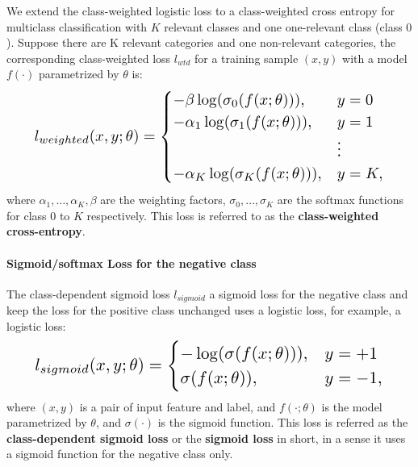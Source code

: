 We extend the class-weighted logistic loss to a class-weighted cross entropy for multiclass classification with $K$ relevant classes and one one-relevant class (class $0$).
Suppose there are K relevant categories and one non-relevant categories, the corresponding class-weighted loss $l_{wtd}$ for a training sample $(x,y)$ with a model $f(\cdot)$ parametrized by $\theta$ is:
\begin{eqnarray}
\resizebox{0.9\columnwidth}{!}{$
l_{weighted}(x, y; \theta) =
  \begin{cases}
    - \beta  \log (\sigma_0(f(x;\theta))), & y = 0 \\
    - \alpha_1 \log (\sigma_1(f(x;\theta))), & y = 1 \\
                                            & \vdots \\
    - \alpha_K \log (\sigma_K(f(x;\theta))), & y = K,
  \end{cases}
$}
\end{eqnarray}
where $\alpha_1, \dots, \alpha_K, \beta$ are the weighting factors, $\sigma_0, \dots, \sigma_K$ are the softmax functions for class $0$ to $K$ respectively.
This loss is referred to as the \textbf{class-weighted cross-entropy}.


\paragraph{Sigmoid/softmax Loss for the negative class}

The class-dependent sigmoid loss $l_{sigmoid}$ a sigmoid loss for the negative class and keep the loss for the positive class unchanged uses a logistic loss, for example, a logistic loss:
\begin{eqnarray}
\resizebox{0.9\columnwidth}{!}{$
l_{sigmoid}(x, y; \theta) =
  \begin{cases}
    - \log (\sigma(f(x; \theta))) , & y = +1 \\
    \sigma(f(x; \theta)), & y = -1,
  \end{cases}
$}
\end{eqnarray}
where $(x, y)$ is a pair of input feature and label, and $f(\cdot;\theta)$ is the model parametrized by $\theta$, and $\sigma(\cdot)$ is the sigmoid function.
This loss is referred as the \textbf{class-dependent sigmoid loss} or the \textbf{sigmoid loss} in short, in a sense it uses a sigmoid function for the negative class only.


